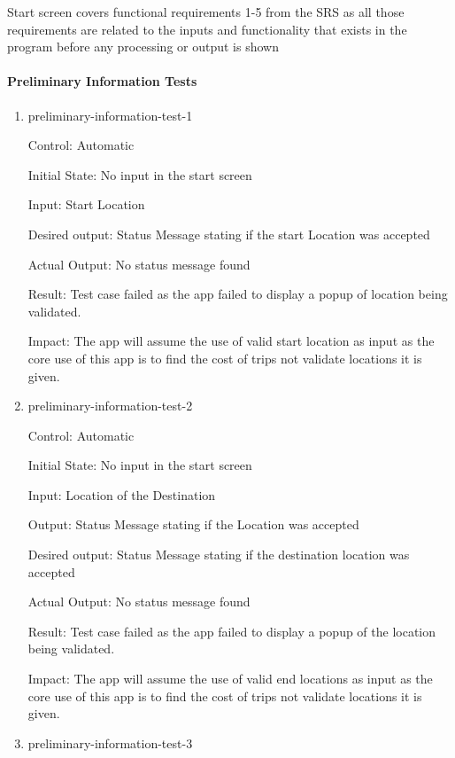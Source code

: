 \documentclass[12pt, titlepage]{article}
\begin{document}
Start screen covers functional requirements 1-5 from the SRS as all those requirements 
are related to the inputs and functionality that exists in the program before any 
processing or output is shown
		
\paragraph{Preliminary Information Tests} 

\begin{enumerate}

\item{preliminary-information-test-1\\}

Control: Automatic
					
Initial State: No input in the start screen
					
Input: Start Location
					
Desired output: Status Message stating if the start Location was accepted

Actual Output: No status message found

Result: Test case failed as the app failed to display a popup of location being validated.

Impact: The app will assume the use of valid start location as input as the core use of this app is 
to find the cost of trips not validate locations it is given.
					
\item{preliminary-information-test-2\\}

Control: Automatic
					
Initial State: No input in the start screen
					
Input: Location of the Destination
					
Output: Status Message stating if the Location was accepted

Desired output: Status Message stating if the destination location was accepted

Actual Output: No status message found

Result: Test case failed as the app failed to display a popup of the location being validated.

Impact: The app will assume the use of valid end locations as input as the core use of this app is 
to find the cost of trips not validate locations it is given.

\item{preliminary-information-test-3\\}


\end{enumerate}
\end{document}
